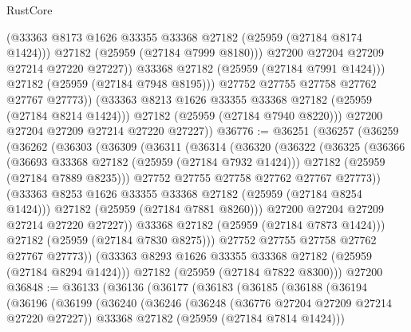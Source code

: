 \begin{lexlean}{RustCore}
\begin{coremodule}
                        (@33363 @8173 @1626 @33355 @33368 @27182 (@25959 (@27184 @8174 @1424)))
                        @27182
                        (@25959 (@27184 @7999 @8180)))
                      @27200
                      @27204
                      @27209
                      @27214
                      @27220
                      @27227))
                  @33368
                  @27182
                  (@25959 (@27184 @7991 @1424)))
                @27182
                (@25959 (@27184 @7948 @8195)))
              @27752
              @27755
              @27758
              @27762
              @27767
              @27773))
          (@33363 @8213 @1626 @33355 @33368 @27182 (@25959 (@27184 @8214 @1424)))
          @27182
          (@25959 (@27184 @7940 @8220)))
        @27200
        @27204
        @27209
        @27214
        @27220
        @27227))
@36776 := @36251
    (@36257
      (@36259
        (@36262
          (@36303
            (@36309
              (@36311
                (@36314
                  (@36320
                    (@36322
                      (@36325
                        (@36366
                          (@36693 @33368 @27182 (@25959 (@27184 @7932 @1424)))
                          @27182
                          (@25959 (@27184 @7889 @8235)))
                        @27752
                        @27755
                        @27758
                        @27762
                        @27767
                        @27773))
                    (@33363 @8253 @1626 @33355 @33368 @27182 (@25959 (@27184 @8254 @1424)))
                    @27182
                    (@25959 (@27184 @7881 @8260)))
                  @27200
                  @27204
                  @27209
                  @27214
                  @27220
                  @27227))
              @33368
              @27182
              (@25959 (@27184 @7873 @1424)))
            @27182
            (@25959 (@27184 @7830 @8275)))
          @27752
          @27755
          @27758
          @27762
          @27767
          @27773))
      (@33363 @8293 @1626 @33355 @33368 @27182 (@25959 (@27184 @8294 @1424)))
      @27182
      (@25959 (@27184 @7822 @8300)))
    @27200
@36848 := @36133
    (@36136
      (@36177
        (@36183
          (@36185
            (@36188
              (@36194
                (@36196
                  (@36199
                    (@36240
                      (@36246
                        (@36248 (@36776 @27204 @27209 @27214 @27220 @27227))
                        @33368
                        @27182
                        (@25959 (@27184 @7814 @1424)))

\end{coremodule}
\end{lexlean}
